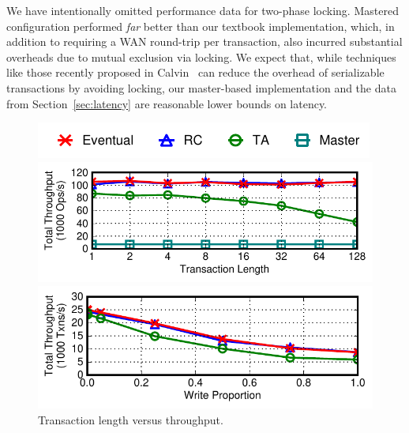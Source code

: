 We have intentionally omitted performance data for two-phase
locking. Mastered configuration performed \textit{far} better than our
textbook implementation, which, in addition to requiring a WAN
round-trip per transaction, also incurred substantial overheads due to
mutual exclusion via locking. We expect that, while techniques like
those recently proposed in Calvin~\cite{calvin} can reduce the
overhead of serializable transactions by avoiding locking, our
master-based implementation and the data from
Section~\ref{sec:latency} are reasonable lower bounds on latency.

\begin{figure}[t!]
\begin{center}
\hspace{2em}\includegraphics[width=.8\columnwidth]{figs/strategylegend.pdf}\vspace{-2em}
\end{center}
\begin{center}
\includegraphics[width=\figfactor\columnwidth]{figs/finals/txnlen-thru.pdf}
\end{center}\vspace{-2.25em}
\caption{Transaction length versus throughput.}\vspace{-1em}
\label{fig:txlen}
\begin{center}
\includegraphics[width=\figfactor\columnwidth]{figs/finals/wprop-thru.pdf}

\end{center}
\end{figure}

